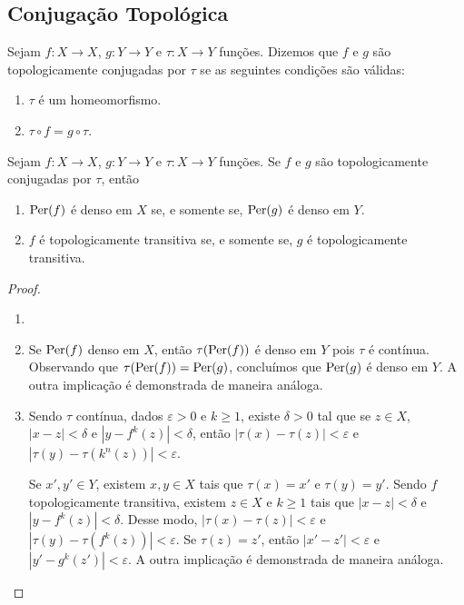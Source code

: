 \subsection{Conjugação Topológica}

\begin{definition}
Sejam $f: X \to X$, $g: Y \to Y$ e $\tau: X \to Y$ funções. Dizemos que $f$ e $g$ são topologicamente conjugadas por $\tau$ se as seguintes condições são válidas:
\begin{enumerate}[label=\roman*.]
\item $\tau$ é um homeomorfismo.
\item $\tau \circ f = g \circ \tau$.
\end{enumerate}
\end{definition}

\begin{proposition}
\label{proposicao conjugacaotopologica 1}
Sejam $f: X \to X$, $g: Y \to Y$ e $\tau: X \to Y$ funções. Se $f$ e $g$ são topologicamente conjugadas por $\tau$, então
\begin{enumerate}
\item $\operatorname{Per}(f)$ é denso em $X$ se, e somente se, $\operatorname{Per}(g)$ é denso em $Y$.

\item $f$ é topologicamente transitiva se, e somente se, $g$ é topologicamente transitiva.
\end{enumerate}
\end{proposition}

\begin{proof}
\begin{enumerate}\item[]
\item Se $\operatorname{Per}(f)$ denso em $X$, então $\tau(\operatorname{Per}(f))$ é denso em $Y$ pois $\tau$ é contínua. Observando que $\tau(\operatorname{Per}(f)) = \operatorname{Per}(g)$, concluímos que $\operatorname{Per}(g)$ é denso em $Y$. A outra implicação é demonstrada de maneira análoga.

\item Sendo $\tau$ contínua, dados $\varepsilon > 0$ e $k \geq 1$, existe $\delta > 0$ tal que se $z \in X$, $|x - z| < \delta$ e $|y - f^k(z)| < \delta$, então $|\tau(x) - \tau(z)| < \varepsilon$ e $|\tau(y) - \tau(k^n(z))| < \varepsilon$.

Se $x', y' \in Y$, existem $x, y \in X$ tais que $\tau(x) = x'$ e $\tau(y) =  y'$. Sendo $f$ topologicamente transitiva, existem $z \in X$ e $k \geq 1$ tais que $|x - z| < \delta$ e $|y - f^k(z)| < \delta$. Desse modo, $|\tau(x) - \tau(z)| < \varepsilon$ e $|\tau(y) - \tau(f^k(z))| < \varepsilon$. Se $\tau(z) = z'$, então $|x' - z'| < \varepsilon$ e $|y' - g^k(z')| < \varepsilon$. A outra implicação é demonstrada de maneira análoga.
\end{enumerate}
\end{proof}


